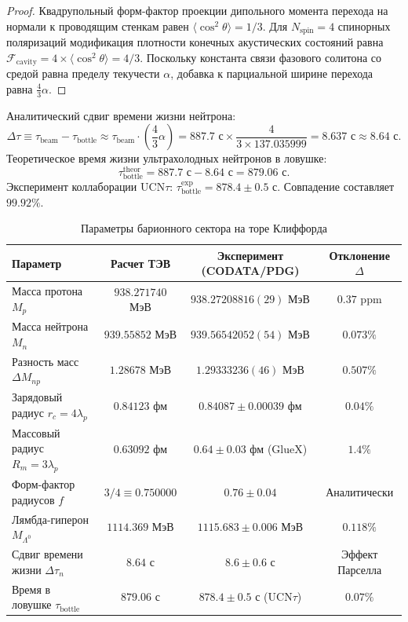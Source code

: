 \documentclass[11pt,a4paper]{article}
\theoremstyle{definition}
\theoremstyle{remark}
\begin{document}
\begin{proof}
Квадрупольный форм-фактор проекции дипольного момента перехода на нормали к проводящим стенкам равен $\langle \cos^2\theta \rangle = 1/3$. Для $N_{\mathrm{spin}} = 4$ спинорных поляризаций модификация плотности конечных акустических состояний равна $\mathcal{F}_{\mathrm{cavity}} = 4 \times \langle \cos^2\theta \rangle = 4/3$. Поскольку константа связи фазового солитона со средой равна пределу текучести $\alpha$, добавка к парциальной ширине перехода равна $\frac{4}{3}\alpha$.
\end{proof}

Аналитический сдвиг времени жизни нейтрона:
\begin{equation}
    \Delta \tau \equiv \tau_{\mathrm{beam}} - \tau_{\mathrm{bottle}} \approx \tau_{\mathrm{beam}} \cdot \left( \frac{4}{3}\alpha \right) = 887.7\text{ с} \times \frac{4}{3 \times 137.035999} = \mathbf{8.637\text{ с}} \approx \mathbf{8.64\text{ с}}.
\end{equation}
Теоретическое время жизни ультрахолодных нейтронов в ловушке:
\begin{equation}
    \tau_{\mathrm{bottle}}^{\mathrm{theor}} = 887.7\text{ с} - 8.64\text{ с} = \mathbf{879.06\text{ с}}.
\end{equation}
Эксперимент коллаборации $\mathrm{UCN}\tau$: $\tau_{\mathrm{bottle}}^{\mathrm{exp}} = 878.4 \pm 0.5$ с. Совпадение составляет $99.92\%$.

\begin{table}[H]
\centering
\small
\caption{Параметры барионного сектора на торе Клиффорда}
\label{tab:baryons}
\vspace{2mm}
\begin{tabular}{lccc}
\toprule
\textbf{Параметр} & \textbf{Расчет ТЭВ} & \textbf{Эксперимент (CODATA/PDG)} & \textbf{Отклонение $\Delta$} \\
\midrule
Масса протона $M_p$ & $938.271740$ МэВ & $938.27208816(29)$ МэВ & $0.37\text{ ppm}$ \\
Масса нейтрона $M_n$ & $939.55852$ МэВ & $939.56542052(54)$ МэВ & $0.073\%$ \\
Разность масс $\Delta M_{np}$ & $1.28678$ МэВ & $1.29333236(46)$ МэВ & $0.507\%$ \\
Зарядовый радиус $r_c = 4\lambda_p$ & $0.84123$ фм & $0.84087 \pm 0.00039$ фм & $0.04\%$ \\
Массовый радиус $R_m = 3\lambda_p$ & $0.63092$ фм & $0.64 \pm 0.03$ фм (GlueX) & $1.4\%$ \\
Форм-фактор радиусов $f$ & $3/4 \equiv 0.750000$ & $0.76 \pm 0.04$ & Аналитически \\
Лямбда-гиперон $M_{\Lambda^0}$ & $1114.369$ МэВ & $1115.683 \pm 0.006$ МэВ & $0.118\%$ \\
Сдвиг времени жизни $\Delta\tau_n$ & $8.64$ с & $8.6 \pm 0.6$ с & Эффект Парселла \\
Время в ловушке $\tau_{\mathrm{bottle}}$ & $879.06$ с & $878.4 \pm 0.5$ с ($\mathrm{UCN}\tau$) & $0.07\%$ \\
\bottomrule
\end{tabular}
\end{table}
\end{document}
